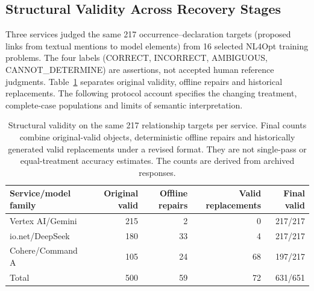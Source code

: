 \subsection{Structural Validity Across Recovery Stages}
\label{app:relationship-overview}
Three services judged the same 217 occurrence--declaration targets (proposed links from textual mentions to model elements) from 16 selected NL4Opt training problems. The four labels (CORRECT, INCORRECT, AMBIGUOUS, CANNOT\_DETERMINE) are assertions, not accepted human reference judgments. Table~\ref{tab:relationship-validity} separates original validity, offline repairs and historical replacements. The following protocol account specifies the changing treatment, complete-case populations and limits of semantic interpretation.

\begin{table}[htbp]\centering\small
\caption{Structural validity on the same 217 relationship targets per service. Final counts combine original-valid objects, deterministic offline repairs and historically generated valid replacements under a revised format. They are not single-pass or equal-treatment accuracy estimates. The counts are derived from archived responses.}\label{tab:relationship-validity}
\setlength{\tabcolsep}{3.5pt}
\begin{tabular}{@{}lrrrr@{}}\toprule
Service/model family & Original valid & Offline repairs & Valid replacements & Final valid\\\midrule
Vertex AI/Gemini & 215 & 2 & 0 & 217/217\\
io.net/DeepSeek & 180 & 33 & 4 & 217/217\\
Cohere/Command A & 105 & 24 & 68 & 197/217\\\midrule
Total & 500 & 59 & 72 & 631/651\\\bottomrule
\end{tabular}\end{table}
